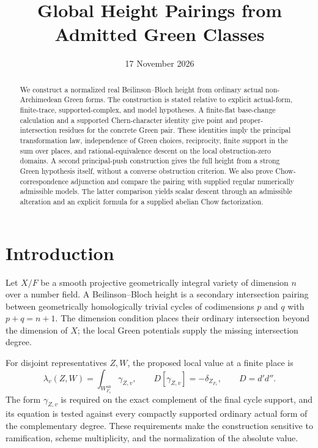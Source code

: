 \documentclass[11pt,a4paper]{article}
\title{Global Height Pairings from Admitted Green Classes}
\author{}
\date{17 November 2026}
\theoremstyle{definition}
\theoremstyle{remark}
\numberwithin{equation}{section}
\newcommand{\an}{\mathrm{an}}
\begin{document}
\maketitle
\begin{abstract}
We construct a normalized real Beilinson--Bloch height from ordinary actual non-Archimedean Green forms. The construction is stated relative to explicit actual-form, finite-trace, supported-complex, and model hypotheses. A finite-flat base-change calculation and a supported Chern-character identity give point and proper-intersection residues for the concrete Green pair. These identities imply the principal transformation law, independence of Green choices, reciprocity, finite support in the sum over places, and rational-equivalence descent on the local obstruction-zero domains. A second principal-push construction gives the full height from a strong Green hypothesis itself, without a converse obstruction criterion. We also prove Chow-correspondence adjunction and compare the pairing with supplied regular numerically admissible models. The latter comparison yields scalar descent through an admissible alteration and an explicit formula for a supplied abelian Chow factorization.
\end{abstract}

\tableofcontents

\section{Introduction}\label{sec:height-introduction}

Let $X/F$ be a smooth projective geometrically integral variety of dimension $n$ over a number field. A Beilinson--Bloch height is a secondary intersection pairing between geometrically homologically trivial cycles of codimensions $p$ and $q$ with $p+q=n+1$. The dimension condition places their ordinary intersection beyond the dimension of $X$; the local Green potentials supply the missing intersection degree.

For disjoint representatives $Z,W$, the proposed local value at a finite place is
\[
 \lambda_v(Z,W)=\int_{W_{F_v}^{\an}}\gamma_{Z,v},
 \qquad D[\gamma_{Z,v}]=-\delta_{Z_{F_v}},\qquad D=d'd''.
\]
The form $\gamma_{Z,v}$ is required on the exact complement of the final cycle support, and its equation is tested against every compactly supported ordinary actual form of the complementary degree. These requirements make the construction sensitive to ramification, scheme multiplicity, and the normalization of the absolute value.
\end{document}
